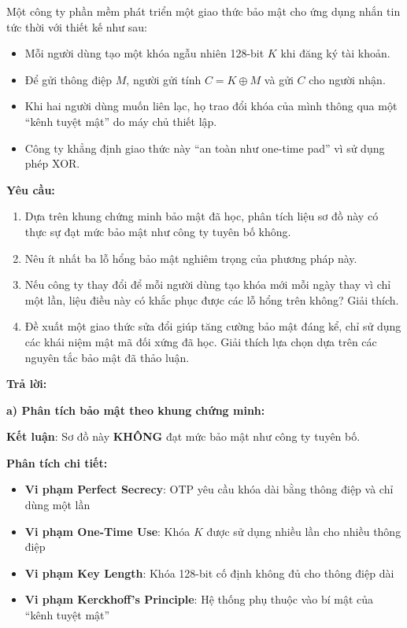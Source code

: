 Một công ty phần mềm phát triển một giao thức bảo mật cho ứng dụng nhắn tin tức thời với thiết kế như sau:

\begin{itemize}
    \item Mỗi người dùng tạo một khóa ngẫu nhiên 128-bit $K$ khi đăng ký tài khoản.
    \item Để gửi thông điệp $M$, người gửi tính $C = K \oplus M$ và gửi $C$ cho người nhận.
    \item Khi hai người dùng muốn liên lạc, họ trao đổi khóa của mình thông qua một ``kênh tuyệt mật'' do máy chủ thiết lập.
    \item Công ty khẳng định giao thức này ``an toàn như one-time pad'' vì sử dụng phép XOR.
\end{itemize}

\textbf{Yêu cầu:}

\begin{enumerate}
    \item Dựa trên khung chứng minh bảo mật đã học, phân tích liệu sơ đồ này có thực sự đạt mức bảo mật như công ty tuyên bố không.
    \item Nêu ít nhất ba lỗ hổng bảo mật nghiêm trọng của phương pháp này.
    \item Nếu công ty thay đổi để mỗi người dùng tạo khóa mới mỗi ngày thay vì chỉ một lần, liệu điều này có khắc phục được các lỗ hổng trên không? Giải thích.
    \item Đề xuất một giao thức sửa đổi giúp tăng cường bảo mật đáng kể, chỉ sử dụng các khái niệm mật mã đối xứng đã học. Giải thích lựa chọn dựa trên các nguyên tắc bảo mật đã thảo luận.
\end{enumerate}

\begin{center}
\textbf{Trả lời:}
\end{center}

\textbf{a) Phân tích bảo mật theo khung chứng minh:}

\textbf{Kết luận}: Sơ đồ này \textbf{KHÔNG} đạt mức bảo mật như công ty tuyên bố.

\textbf{Phân tích chi tiết:}
\begin{itemize}
    \item \textbf{Vi phạm Perfect Secrecy}: OTP yêu cầu khóa dài bằng thông điệp và chỉ dùng một lần
    \item \textbf{Vi phạm One-Time Use}: Khóa $K$ được sử dụng nhiều lần cho nhiều thông điệp
    \item \textbf{Vi phạm Key Length}: Khóa 128-bit cố định không đủ cho thông điệp dài
    \item \textbf{Vi phạm Kerckhoff's Principle}: Hệ thống phụ thuộc vào bí mật của ``kênh tuyệt mật''
\end{itemize}

